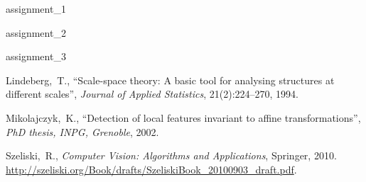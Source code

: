 \documentclass[a4paper,psfig,subfigure,epsfig,fleqn,ausarbeitung,amssmb,float,caption,fontenc]{article}
\begin{document}
%
%
%
%

 {assignment_1}
\FloatBarrier %

 {assignment_2}
\FloatBarrier %

 {assignment_3}
\FloatBarrier %



\fontsize{9}{10pt}


\begin{thebibliography}{10}


Lindeberg,~T.,
\newblock ``Scale-space theory: A basic tool for analysing structures at different scales'',
\newblock \textit{Journal of Applied Statistics}, 21(2):224–270, 1994.

Mikolajczyk,~K.,
\newblock ``Detection of local features invariant to affine transformations'',
\newblock \textit{PhD thesis, INPG, Grenoble}, 2002.

Szeliski,~R.,
\newblock \textit{Computer Vision: Algorithms and Applications},
\newblock Springer, 2010.
\newblock \url{http://szeliski.org/Book/drafts/SzeliskiBook_20100903_draft.pdf}.

\end{thebibliography}
\end{document}
